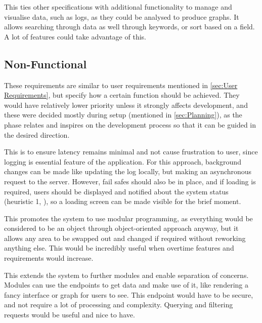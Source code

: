 \documentclass[../main.tex]{subfiles}
\begin{document}
This ties other specifications with additional functionality to manage and visualise data, such as logs, as they could be analysed to produce graphs. It allows searching through data as well through keywords, or sort based on a field. A lot of features could take advantage of this.

\subsection{Non-Functional}

These requirements are similar to user requirements mentioned in \ref{sec:User Requirements}, but specify how a certain function should be achieved. They would have relatively lower priority unless it strongly affects development, and these were decided mostly during setup (mentioned in \ref{sec:Planning}), as the phase relates and inspires on the development process so that it can be guided in the desired direction.


This is to ensure latency remains minimal and not cause frustration to user, since logging is essential feature of the application. For this approach, background changes can be made like updating the log locally, but making an asynchronous request to the server. However, fail safes should also be in place, and if loading is required, users should be displayed and notified about the system status (heuristic 1, \cite{experience10UsabilityHeuristics}), so a loading screen can be made visible for the brief moment.


This promotes the system to use modular programming, as everything would be considered to be an object through object-oriented approach anyway, but it allows any area to be swapped out and changed if required without reworking anything else. This would be incredibly useful when overtime features and requirements would increase.


This extends the system to further modules and enable separation of concerns. Modules can use the endpoints to get data and make use of it, like rendering a fancy interface or graph for users to see. This endpoint would have to be secure, and not require a lot of processing and complexity. Querying and filtering requests would be useful and nice to have.
\end{document}
